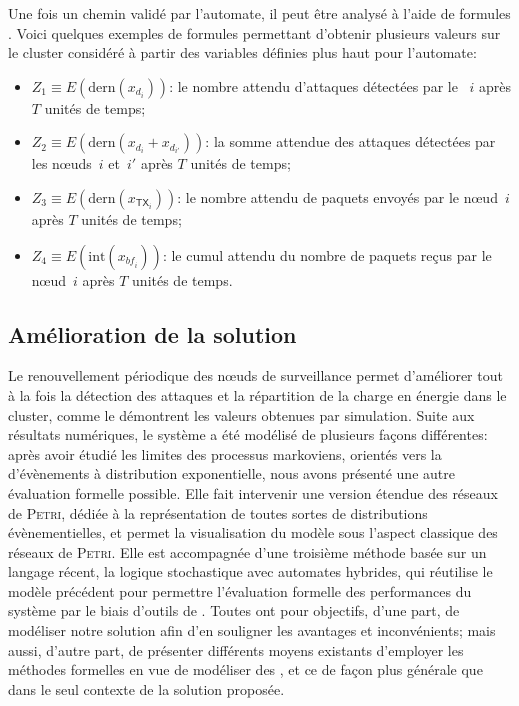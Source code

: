 Une fois un chemin validé par l'automate, il peut être analysé à l'aide de formules \lsah.
Voici quelques exemples de formules \lsah permettant d'obtenir plusieurs valeurs sur le cluster considéré à partir des variables définies plus haut pour l'automate:
\begin{itemize}
    \item $Z_1\equiv E(\mbox{dern}(x_{d_i}))$: le nombre attendu d'attaques détectées par le \cn~$i$ après $T$ unités de temps;
    \item $Z_2\equiv E(\mbox{dern}(x_{d_i}+x_{d_{i'}}))$: la somme attendue des attaques détectées par les nœuds~$i$ et~$i'$ après $T$ unités de temps;
    \item $Z_3\equiv E(\mbox{dern}(x_{\mathsf{TX}_i}))$: le nombre attendu de paquets envoyés par le nœud~$i$ après $T$ unités de temps;
    \item $Z_4\equiv E(\mbox{int}(x_{\mathit{bf}_i}))$: le cumul attendu du nombre de paquets reçus par le nœud~$i$ après $T$ unités de temps.
\end{itemize}

    \subsection{Amélioration de la solution}

Le renouvellement périodique des nœuds de surveillance permet d'améliorer tout à la fois la détection des attaques et la répartition de la charge en énergie dans le cluster, comme le démontrent les valeurs obtenues par simulation.
Suite aux résultats numériques, le système a été modélisé de plusieurs façons différentes: après avoir étudié les limites des processus markoviens, orientés vers la  d'évènements à distribution exponentielle, nous avons présenté une autre évaluation formelle possible.
Elle fait intervenir une version étendue des réseaux de \textsc{Petri}, dédiée à la représentation de toutes sortes de distributions évènementielles, et permet la visualisation du modèle sous l'aspect classique des réseaux de \textsc{Petri}.
Elle est accompagnée d'une troisième méthode basée sur un langage récent, la logique stochastique avec automates hybrides, qui réutilise le modèle précédent pour permettre l'évaluation formelle des performances du système par le biais d'outils de \modelchecking.
Toutes ont pour objectifs, d'une part, de modéliser notre solution afin d'en souligner les avantages et inconvénients; mais aussi, d'autre part, de présenter différents moyens existants d'employer les méthodes formelles en vue de modéliser des \rcs, et ce de façon plus générale que dans le seul contexte de la solution proposée.

